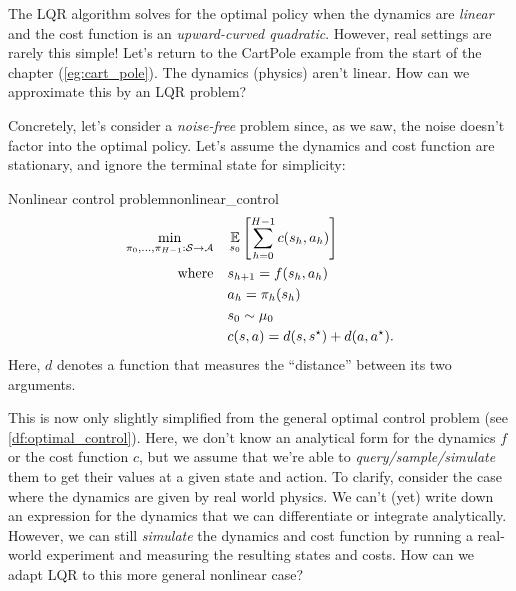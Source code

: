 \documentclass[\main/main]{subfiles}
\begin{document}
The LQR algorithm solves for the optimal policy when the dynamics are \emph{linear} and the cost function is an \emph{upward-curved quadratic}.
However, real settings are rarely this simple!
Let's return to the CartPole example from the start of the chapter (\autoref{eg:cart_pole}).
The dynamics (physics) aren't linear. How can we approximate this by an LQR problem?

Concretely, let's consider a \emph{noise-free} problem since, as we saw, the noise doesn't factor into the optimal policy. Let's assume the dynamics and cost function are stationary, and ignore the terminal state for simplicity:

\begin{definition}{Nonlinear control problem}{nonlinear_control}
    \begin{align*}
        \min_{\pi_0, \dots, \pi_{H-1} : \mathcal{S} \to \mathcal{A}} \quad & \operatorname*{\mathbb{E}}_{s_0} \left[ \sum_{h=0}^{H-1} c(s_h, a_h) \right] \\
        \text{where} \quad                                  & s_{h+1} = f(s_h, a_h)                                   \\
                                                            & a_h = \pi_h(s_h)                                          \\
                                                            & s_0 \sim \mu_0                                                     \\
                                                            & c(s, a) = d(s, s^\star) + d(a, a^\star).
    \end{align*}
    Here, $d$ denotes a function that measures the ``distance'' between its two arguments.
\end{definition}

This is now only slightly simplified from the general optimal control problem (see \ref{df:optimal_control}). Here, we don't know an analytical form for the dynamics $f$ or the cost function $c$,
but we assume that we're able to \emph{query/sample/simulate} them to get their values at a given state and action.
To clarify, consider the case where the dynamics are given by real world physics.
We can't (yet) write down an expression for the dynamics that we can differentiate or integrate analytically.
However, we can still \emph{simulate} the dynamics and cost function by running a real-world experiment and measuring the resulting states and costs.
How can we adapt LQR to this more general nonlinear case?
\end{document}
